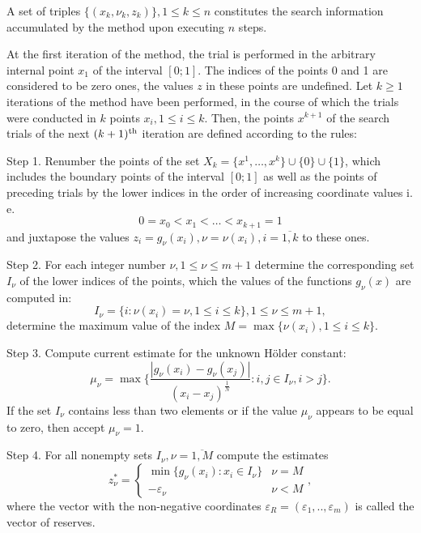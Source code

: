 \documentclass[runningheads]{llncs}
\begin{document}
A set of triples \(\{(x_k,\nu_k,z_k)\}, 1\leqslant k\leqslant n\) constitutes the search information
accumulated by the method upon executing \(n\) steps.

At the first iteration of the method, the trial is performed in the arbitrary internal point \(x_1\) of
the interval \([0;1]\).
The indices of the points 0 and 1 are considered to be zero ones, the values \(z\) in these points
are undefined.
Let \(k\geqslant 1\) iterations of the method have been performed, in the course of which the
trials were conducted in \(k\) points \(x_i, 1\leqslant i\leqslant k\).
Then, the points \(x^{k+1}\) of the search trials of the next \((k+1)^{\rm th}\) iteration are
defined according to the rules:

Step 1. Renumber the points of the set \(X_k=\{x^1,\dotsc,x^k\}\cup\{0\}\cup\{1\}\), which
includes the boundary points of the interval \([0;1]\) as well as the points of preceding trials by
the lower indices in the order of increasing coordinate values i. e.
\begin{equation}
  \label{eq:points}
  0=x_0<x_1<\dotsc<x_{k+1}=1
\end{equation}
and juxtapose the values \(z_{i}=g_{\nu }(x_{i}),\nu =\nu (x_{i}),i={\overline {1,k}}\) to these
ones.

Step 2. For each integer number \(\nu ,1\leqslant \nu \leqslant m+1\) determine the corresponding
set \(I_{\nu }\) of the lower indices of the points, which the values of the functions \(g_{\nu
}(x)\) are computed in:
\begin{displaymath}
  I_{\nu }=\{i:\nu (x_{i})=\nu ,1\leqslant i\leqslant k\},1\leq \nu \leqslant m+1,
\end{displaymath}
determine the maximum value of the index \(M=\max\{\nu (x_{i}),1\leq i\leq k\}\).

Step 3. Compute current estimate for the unknown H\"{o}lder constant:
\begin{equation}
  \label{step2}
  \mu _{\nu }=\max\{\frac{|g_{\nu }(x_{i})-g_{\nu }(x_{j})|}{(x_{i}-
x_{j})^{\frac{1}{N}}}:i,j\in I_{\nu },i>j\}.
\end{equation}
If the set \(I_{\nu }\) contains less than two elements or if the value \(\mu _{\nu }\) appears to
be equal to zero, then accept \(\mu _{\nu }=1\).

Step 4. For all nonempty sets \(I_{\nu },\nu ={\overline {1,M}}\) compute the estimates
\begin{equation}
  \label{eq:step_4}
  z_{\nu }^{*}={\begin{cases}\min\{g_{\nu }(x_{i}):x_{i}\in I_{\nu }\}&\nu =M\\-\varepsilon
_{\nu }&\nu <M\end{cases}},
\end{equation}
where the vector with the non-negative coordinates \(\varepsilon _{R}=(\varepsilon
_{1},..,\varepsilon _{m})\) is called the vector of reserves.
\end{document}
